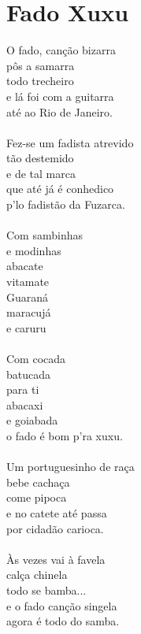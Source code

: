 \documentclass{article}
\begin{document}
\section{ Fado Xuxu}
O fado, canção bizarra\\
pôs a samarra\\
todo trecheiro\\
e lá foi com a guitarra\\
até ao Rio de Janeiro.\\
\\
Fez-se um fadista atrevido\\
tão destemido\\
e de tal marca\\
que até já é conhedico\\
p'lo fadistão da Fuzarca.\\
\\
Com sambinhas\\
e modinhas\\
abacate\\
vitamate\\
Guaraná\\
maracujá\\
e caruru\\
\\
Com cocada\\
batucada\\
para ti \\
abacaxi\\
e goiabada\\
o fado é bom p'ra xuxu.\\
\\
Um portuguesinho de raça\\
bebe cachaça \\
come pipoca\\
e no catete até passa\\
por cidadão carioca.\\
\\
Às vezes vai à favela\\
calça chinela\\
todo se bamba...\\
e o fado canção singela \\
agora é todo do samba.\\
\end{document}
